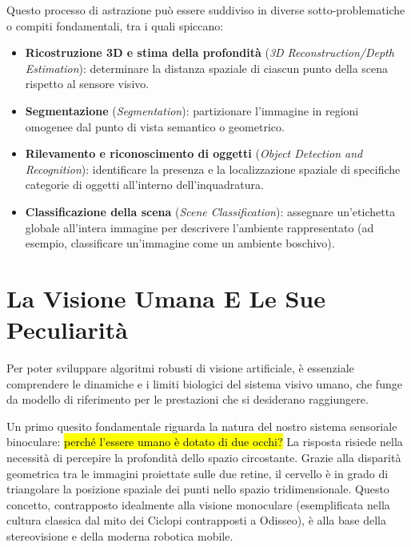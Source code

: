 ﻿\documentclass[11pt, a4paper]{article}
\begin{document}
Questo processo di astrazione può essere suddiviso in diverse sotto-problematiche o compiti fondamentali, tra i quali spiccano:
\begin{itemize}[noitemsep]
    \item \textbf{Ricostruzione 3D e stima della profondità} (\emph{3D Reconstruction/Depth Estimation}): determinare la distanza spaziale di ciascun punto della scena rispetto al sensore visivo.
    \item \textbf{Segmentazione} (\emph{Segmentation}): partizionare l'immagine in regioni omogenee dal punto di vista semantico o geometrico.
    \item \textbf{Rilevamento e riconoscimento di oggetti} (\emph{Object Detection and Recognition}): identificare la presenza e la localizzazione spaziale di specifiche categorie di oggetti all'interno dell'inquadratura.
    \item \textbf{Classificazione della scena} (\emph{Scene Classification}): assegnare un'etichetta globale all'intera immagine per descrivere l'ambiente rappresentato (ad esempio, classificare un'immagine come un ambiente boschivo).
\end{itemize}


\newpage

\section{La Visione Umana E Le Sue Peculiarità}

Per poter sviluppare algoritmi robusti di visione artificiale, è essenziale comprendere le dinamiche e i limiti biologici del sistema visivo umano, che funge da modello di riferimento per le prestazioni che si desiderano raggiungere.

Un primo quesito fondamentale riguarda la natura del nostro sistema sensoriale binoculare: \hl{perché l'essere umano è dotato di due occhi?} La risposta risiede nella necessità di percepire la profondità dello spazio circostante. Grazie alla disparità geometrica tra le immagini proiettate sulle due retine, il cervello è in grado di triangolare la posizione spaziale dei punti nello spazio tridimensionale. Questo concetto, contrapposto idealmente alla visione monoculare (esemplificata nella cultura classica dal mito dei Ciclopi contrapposti a Odisseo), è alla base della stereovisione e della moderna robotica mobile.
\end{document}
